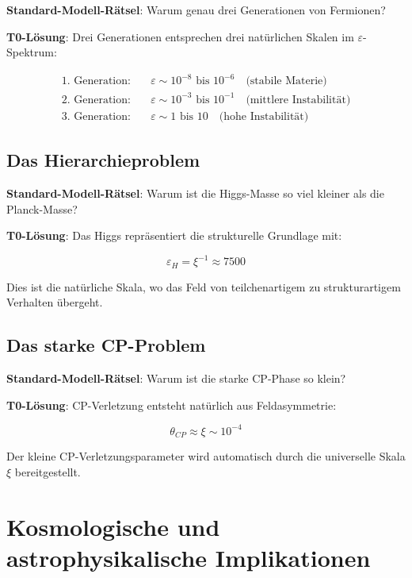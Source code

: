\documentclass[12pt,a4paper]{article}
\newcommand{\xipar}{\xi}
\begin{document}
	\textbf{Standard-Modell-Rätsel}: Warum genau drei Generationen von Fermionen?
	
	\textbf{T0-Lösung}: Drei Generationen entsprechen drei natürlichen Skalen im $\varepsilon$-Spektrum:
	
	\begin{align}
		\text{1. Generation}: \quad &\varepsilon \sim 10^{-8} \text{ bis } 10^{-6} \quad \text{(stabile Materie)} \\
		\text{2. Generation}: \quad &\varepsilon \sim 10^{-3} \text{ bis } 10^{-1} \quad \text{(mittlere Instabilität)} \\
		\text{3. Generation}: \quad &\varepsilon \sim 1 \text{ bis } 10 \quad \text{(hohe Instabilität)}
	\end{align}
	
	\subsection{Das Hierarchieproblem}
	
	\textbf{Standard-Modell-Rätsel}: Warum ist die Higgs-Masse so viel kleiner als die Planck-Masse?
	
	\textbf{T0-Lösung}: Das Higgs repräsentiert die strukturelle Grundlage mit:
	
	\begin{equation}
		\varepsilon_H = \xipar^{-1} \approx 7500
		\label{eq:higgs_epsilon}
	\end{equation}
	
	Dies ist die natürliche Skala, wo das Feld von teilchenartigem zu strukturartigem Verhalten übergeht.
	
	\subsection{Das starke CP-Problem}
	
	\textbf{Standard-Modell-Rätsel}: Warum ist die starke CP-Phase so klein?
	
	\textbf{T0-Lösung}: CP-Verletzung entsteht natürlich aus Feldasymmetrie:
	
	\begin{equation}
		\theta_{CP} \approx \xipar \sim 10^{-4}
		\label{eq:cp_phase}
	\end{equation}
	
	Der kleine CP-Verletzungsparameter wird automatisch durch die universelle Skala $\xipar$ bereitgestellt.
	
	\section{Kosmologische und astrophysikalische Implikationen}
	
\end{document}
